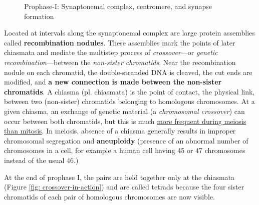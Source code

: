 \documentclass[12pt]{article}
\begin{document}
\begin{enumerate}
\begin{figure}[h!]
    \caption{Prophase-I: Synaptonemal complex, centromere, and synapse formation}
    \label{fig: synapse-formation}
\end{figure}
        Located at intervals along the synaptonemal complex are large protein assemblies called \textbf{recombination nodules}. These assemblies mark the points of later chiasmata and mediate the multistep process of \emph{crossover}—or \emph{genetic recombination}—between the \emph{non-sister chromatids}. Near the recombination nodule on each chromatid, the double-stranded DNA is cleaved, the cut ends are modified, and \textbf{a new connection is made between the non-sister chromatids}. A chiasma (pl. chiasmata) is the point of contact, the physical link, between two (non-sister) chromatids belonging to homologous chromosomes. At a given chiasma, an exchange of genetic material (a \emph{chromosomal crossover}) can occur between both chromatids, but this is much \href{https://en.wikipedia.org/wiki/Chiasma_(genetics)}{more frequent during meiosis than mitosis}. In meiosis, absence of a chiasma generally results in improper chromosomal segregation and \textbf{aneuploidy} (presence of an abnormal number of chromosomes in a cell, for example a human cell having 45 or 47 chromosomes instead of the usual 46.)

        At the end of prophase I, the pairs are held together only at the chiasmata (Figure \ref{fig: crossover-in-action}) and are called tetrads because the four sister chromatids of each pair of homologous chromosomes are now visible.


\end{enumerate}
\end{document}
